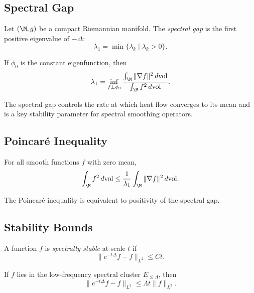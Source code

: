 \subsection{Spectral Gap}

\begin{definition}
Let $(\M,g)$ be a compact Riemannian manifold.  
The \emph{spectral gap} is the first positive eigenvalue of $-\Delta$:
\[
\lambda_1 = \min\{ \lambda_k \mid \lambda_k > 0 \}.
\]
\end{definition}

\begin{lemma}
If $\phi_0$ is the constant eigenfunction, then
\[
\lambda_1 = \inf_{f \perp \phi_0} 
\frac{\int_\M \|\nabla f\|^2\, d\mathrm{vol}}
     {\int_\M f^2\, d\mathrm{vol}}.
\]
\end{lemma}

\begin{remark}
The spectral gap controls the rate at which heat flow converges to its
mean and is a key stability parameter for spectral smoothing operators.
\end{remark}

\subsection{Poincaré Inequality}

\begin{theorem}
For all smooth functions $f$ with zero mean,
\[
\int_\M f^2\, d\mathrm{vol}
\le \frac{1}{\lambda_1}
\int_\M \|\nabla f\|^2\, d\mathrm{vol}.
\]
\end{theorem}

\begin{lemma}
The Poincaré inequality is equivalent to positivity of the spectral gap.
\end{lemma}

\subsection{Stability Bounds}

\begin{definition}
A function $f$ is \emph{spectrally stable} at scale $t$ if
\[
\| e^{-t\Delta} f - f \|_{L^2}
\le C t.
\]
\end{definition}

\begin{lemma}
If $f$ lies in the low-frequency spectral cluster $E_{\le \Lambda}$, then
\[
\| e^{-t\Delta} f - f \|_{L^2}
\le \Lambda t \|f\|_{L^2}.
\]
\end{lemma}

